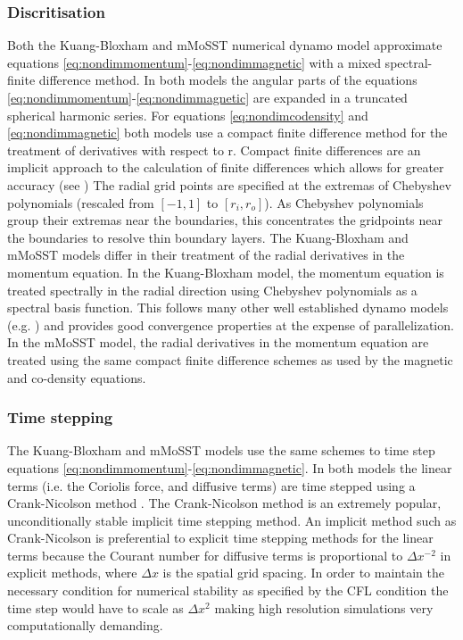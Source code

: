 \subsubsection{Discritisation}
Both the Kuang-Bloxham and mMoSST numerical dynamo model approximate equations \ref{eq:nondimmomentum}-\ref{eq:nondimmagnetic} with a mixed spectral-finite difference method. In both models the angular parts of the equations \ref{eq:nondimmomentum}-\ref{eq:nondimmagnetic} are expanded in a truncated spherical harmonic series. For equations \ref{eq:nondimcodensity} and \ref{eq:nondimmagnetic} both models use a compact finite difference method for the treatment of derivatives with respect to r. Compact finite differences are an implicit approach to the calculation of finite differences which allows for greater accuracy (see \citet{lele1992}) The radial grid points are specified at the extremas of Chebyshev polynomials (rescaled from $[-1, 1]$ to $[r_i, r_o]$). As Chebyshev polynomials group their extremas near the boundaries, this concentrates the gridpoints near the boundaries to resolve thin boundary layers. The Kuang-Bloxham and mMoSST models differ in their treatment of the radial derivatives in the momentum equation. In the Kuang-Bloxham model, the momentum equation is treated spectrally in the radial direction using Chebyshev polynomials as a spectral basis function. This follows many other well established dynamo models (e.g. \citet{wicht2002}) and provides good convergence properties at the expense of parallelization. In the mMoSST model, the radial derivatives in the momentum equation are treated using the same compact finite difference schemes as used by the magnetic and co-density equations.

\subsubsection{Time stepping}
The Kuang-Bloxham and mMoSST models use the same schemes to time step equations \ref{eq:nondimmomentum}-\ref{eq:nondimmagnetic}. In both models the linear terms (i.e. the Coriolis force, and diffusive terms) are time stepped using a Crank-Nicolson method \citep{crank1947}. The Crank-Nicolson method is an extremely popular,  unconditionally stable implicit time stepping method. An implicit method such as Crank-Nicolson is preferential to explicit time stepping methods for the linear terms because the Courant number for diffusive terms is proportional to $\Delta x^{-2}$ in explicit methods, where $\Delta x$ is the spatial grid spacing. In order to maintain the necessary condition for numerical stability as specified by the CFL condition \citep{courant1967} the time step would have to scale as $\Delta x ^{2}$ making high resolution simulations very computationally demanding. 

